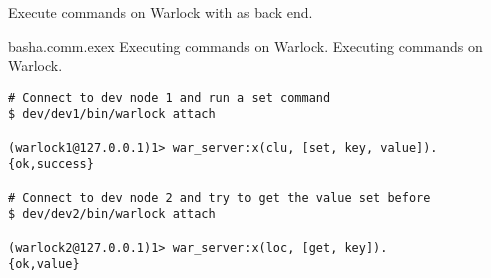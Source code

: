Execute commands on Warlock with  as back end.

\begin{scode}{bash}{a.comm.exex}{%
  Executing commands on Warlock.}{%
  Executing commands on Warlock.}
  \begin{lstlisting}
# Connect to dev node 1 and run a set command
$ dev/dev1/bin/warlock attach

(warlock1@127.0.0.1)1> war_server:x(clu, [set, key, value]).
{ok,success}

# Connect to dev node 2 and try to get the value set before
$ dev/dev2/bin/warlock attach

(warlock2@127.0.0.1)1> war_server:x(loc, [get, key]).
{ok,value}
  \end{lstlisting}
\end{scode}
